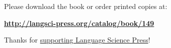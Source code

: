 \documentclass{scrbook}
\begin{document}
Please download the book or order printed copies at:

\bigskip

\textbf{\url{http://langsci-press.org/catalog/book/149}}

\bigskip

Thanks for \href{http://langsci-press.org/supportUs}{supporting Language Science Press}!


\nocite{*}
\printbibliography 
\end{document}
